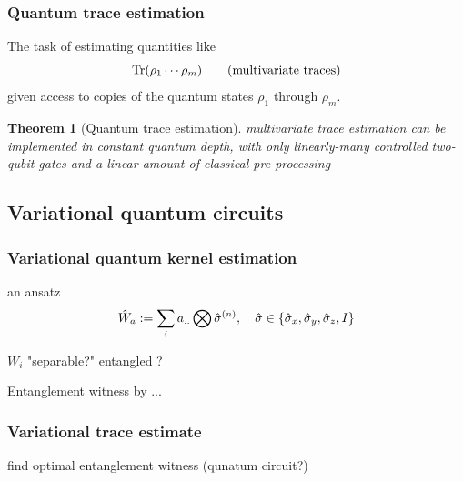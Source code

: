 \documentclass[
aps,
pra,
linenumbers,
floatfix,
]{revtex4-2}
\theoremstyle{plain}
\newtheorem{theorem}{Theorem}
\theoremstyle{definition}
\newcommand{\ew}{\hat{W}}
\newcommand{\dm}{\hat{\rho}}
\begin{document}
\subsubsection{Quantum trace estimation}
The task of estimating quantities like 
\begin{equation}
	\Tr(\rho_1 \cdots \rho_m)
	\tag{multivariate traces}
\end{equation}
given access to copies of the quantum states $\rho_1$  through $\rho_m$.
\begin{theorem}[Quantum trace estimation]
	multivariate trace estimation can be implemented in constant quantum depth, with only linearly-many controlled two-qubit gates and a linear amount of classical pre-processing	
\end{theorem}

\subsection{Variational quantum circuits}
\subsubsection{Variational quantum kernel estimation}
an ansatz
\begin{equation}
	\ew_{a} := \sum_i  a_{..} \bigotimes \hat{\sigma}^{(n)}
	,\quad \hat{\sigma} \in \qty{\sx,\sy,\sz,I}
\end{equation}
\begin{algorithm}[H]
    \DontPrintSemicolon
    \Input{density matrix $\dm$}
    \BlankLine
     {
        $W_i$  
    {\Return "separable?"}
    }
    \Return entangled ?
    \caption{Entanglement witness by ...}
    \label{alg:miller_rabin}
\end{algorithm}

\subsubsection{Variational trace estimate}
find optimal entanglement witness (qunatum circuit?)
\end{document}

